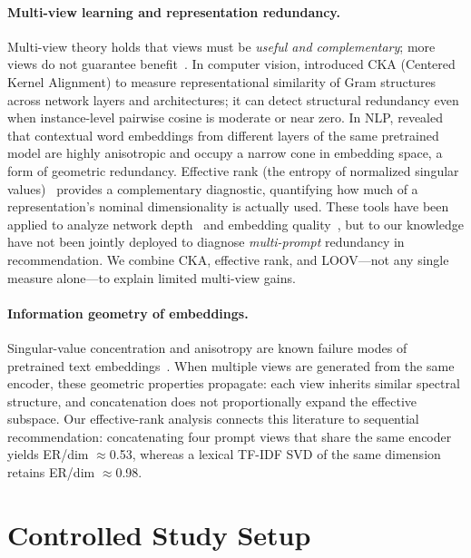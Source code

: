 \documentclass[sigconf,natbib=true,anonymous]{acmart}
\newcommand{\tfidf}{\textsc{TF-IDF}\xspace}
\begin{document}
\paragraph{Multi-view learning and representation redundancy.}
Multi-view theory holds that views must be \emph{useful and complementary}; more views do not guarantee benefit~\cite{xu2013multiview}.
In computer vision, \citet{kornblith2019cka} introduced CKA (Centered Kernel Alignment) to measure representational similarity of Gram structures across network layers and architectures; it can detect structural redundancy even when instance-level pairwise cosine is moderate or near zero.
In NLP, \citet{ethayarajh2019contextual} revealed that contextual word embeddings from different layers of the same pretrained model are highly anisotropic and occupy a narrow cone in embedding space, a form of geometric redundancy.
Effective rank (the entropy of normalized singular values)~\cite{roy2007effective} provides a complementary diagnostic, quantifying how much of a representation's nominal dimensionality is actually used.
These tools have been applied to analyze network depth~\cite{kornblith2019cka} and embedding quality~\cite{ethayarajh2019contextual}, but to our knowledge have not been jointly deployed to diagnose \emph{multi-prompt} redundancy in recommendation.
We combine CKA, effective rank, and LOOV---not any single measure alone---to explain limited multi-view gains.

\paragraph{Information geometry of embeddings.}
Singular-value concentration and anisotropy are known failure modes of pretrained text embeddings~\cite{ethayarajh2019contextual}.
When multiple views are generated from the same encoder, these geometric properties propagate: each view inherits similar spectral structure, and concatenation does not proportionally expand the effective subspace.
Our effective-rank analysis connects this literature to sequential recommendation: concatenating four prompt views that share the same encoder yields ER/dim $\approx$0.53, whereas a lexical \tfidf SVD of the same dimension retains ER/dim $\approx$0.98.

\section{Controlled Study Setup}
\label{sec:setup}
\end{document}
